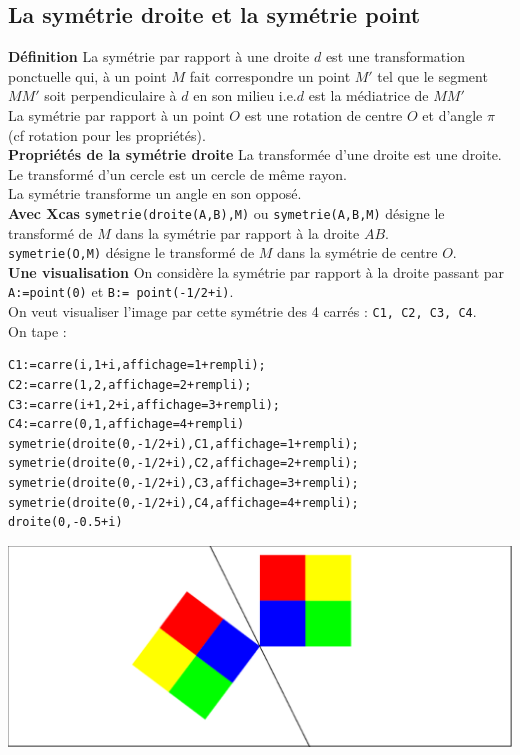 \documentclass[a4paper,11pt]{book}
\begin{document}
\subsection{La sym\'etrie droite et la sym\'etrie point}
{\bf D\'efinition}
La sym\'etrie par rapport \`a une droite $d$ est une transformation 
ponctuelle qui, \`a un point $M$ fait correspondre un point $M'$ tel que 
le segment $MM'$ soit perpendiculaire \`a $d$ en son milieu i.e.$d$ est la 
m\'ediatrice de $MM'$\\
La sym\'etrie par rapport \`a un point $O$ est une rotation de centre $O$ et 
d'angle $\pi$ (cf rotation pour les propri\'et\'es).\\
{\bf Propri\'et\'es de la sym\'etrie droite}
La transform\'ee d'une droite est une droite.\\
Le transform\'e d'un cercle est un cercle de m\^eme rayon.\\
La sym\'etrie transforme un angle en son oppos\'e.\\
{\bf Avec Xcas}
{\tt symetrie(droite(A,B),M)} ou {\tt symetrie(A,B,M)} d\'esigne le transform\'e
de $M$ dans la sym\'etrie par rapport \`a la droite $AB$.\\ 
{\tt symetrie(O,M)}  d\'esigne le transform\'e
de $M$ dans la sym\'etrie de centre $O$.\\ 
{\bf Une visualisation}
On consid\`ere la sym\'etrie par rapport \`a la droite passant par 
{\tt A:=point(0)} et {\tt B:= point(-1/2+i)}.\\
On veut visualiser l'image par cette sym\'etrie des 4 carr\'es :
{\tt C1, C2, C3, C4}.\\
On tape :
\begin{verbatim}
C1:=carre(i,1+i,affichage=1+rempli);
C2:=carre(1,2,affichage=2+rempli);
C3:=carre(i+1,2+i,affichage=3+rempli);
C4:=carre(0,1,affichage=4+rempli)
symetrie(droite(0,-1/2+i),C1,affichage=1+rempli);
symetrie(droite(0,-1/2+i),C2,affichage=2+rempli);
symetrie(droite(0,-1/2+i),C3,affichage=3+rempli);
symetrie(droite(0,-1/2+i),C4,affichage=4+rempli);
droite(0,-0.5+i)
\end{verbatim}
\includegraphics[width=\textwidth]{damiersym}
\end{document}
